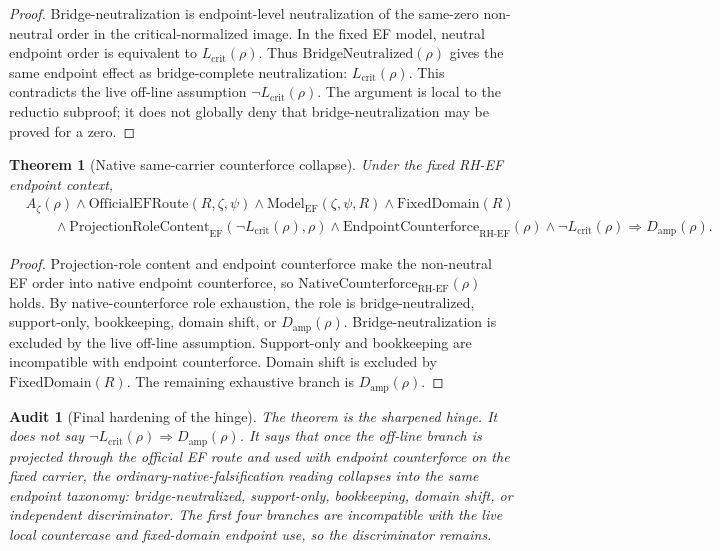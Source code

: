 \documentclass[11pt]{article}
\newtheorem{theorem}{Theorem}[section]
\newtheorem{audit}{Audit}[section]
\newcommand{\Az}{A_{\zeta}}
\newcommand{\Lcrit}{L_{\mathrm{crit}}}
\newcommand{\RH}{\mathrm{RH}}
\newcommand{\EF}{\mathrm{EF}}
\newcommand{\FixedDomain}{\mathrm{FixedDomain}}
\newcommand{\ModelEF}{\mathrm{Model}_{\mathrm{EF}}}
\newcommand{\OfficialEFRoute}{\mathrm{OfficialEFRoute}}
\newcommand{\Damp}{D_{\mathrm{amp}}}
\newcommand{\ProjRoleEF}{\mathrm{ProjectionRoleContent}_{\mathrm{EF}}}
\newcommand{\Counterforce}{\mathrm{EndpointCounterforce}}
\newcommand{\NativeCounterforce}{\mathrm{NativeCounterforce}}
\newcommand{\BridgeNeutralized}{\mathrm{BridgeNeutralized}}
\begin{document}
\begin{proof}
Bridge-neutralization is endpoint-level neutralization of the same-zero non-neutral order in the critical-normalized image.  In the fixed EF model, neutral endpoint order is equivalent to \(\Lcrit(\rho)\).  Thus \(\BridgeNeutralized(\rho)\) gives the same endpoint effect as bridge-complete neutralization: \(\Lcrit(\rho)\).  This contradicts the live off-line assumption \(\neg\Lcrit(\rho)\).  The argument is local to the reductio subproof; it does not globally deny that bridge-neutralization may be proved for a zero.
\end{proof}

\begin{theorem}[Native same-carrier counterforce collapse]
Under the fixed RH-EF endpoint context,
\[
\begin{aligned}
&\Az(\rho)\wedge \OfficialEFRoute(R,\zeta,\psi)\wedge \ModelEF(\zeta,\psi,R)\wedge \FixedDomain(R)\\
&\qquad\wedge\ProjRoleEF(\neg\Lcrit(\rho),\rho)\wedge \Counterforce_{\RH\text{-}\EF}(\rho)
\wedge \neg\Lcrit(\rho)
\Rightarrow \Damp(\rho).
\end{aligned}
\]
\end{theorem}

\begin{proof}
Projection-role content and endpoint counterforce make the non-neutral EF order into native endpoint counterforce, so \(\NativeCounterforce_{\RH\text{-}\EF}(\rho)\) holds.  By native-counterforce role exhaustion, the role is bridge-neutralized, support-only, bookkeeping, domain shift, or \(\Damp(\rho)\).  Bridge-neutralization is excluded by the live off-line assumption.  Support-only and bookkeeping are incompatible with endpoint counterforce.  Domain shift is excluded by \(\FixedDomain(R)\).  The remaining exhaustive branch is \(\Damp(\rho)\).
\end{proof}

\begin{audit}[Final hardening of the hinge]
The theorem is the sharpened hinge.  It does not say \(\neg\Lcrit(\rho)\Rightarrow\Damp(\rho)\).  It says that once the off-line branch is projected through the official EF route and used with endpoint counterforce on the fixed carrier, the ordinary-native-falsification reading collapses into the same endpoint taxonomy: bridge-neutralized, support-only, bookkeeping, domain shift, or independent discriminator.  The first four branches are incompatible with the live local countercase and fixed-domain endpoint use, so the discriminator remains.
\end{audit}
\end{document}

